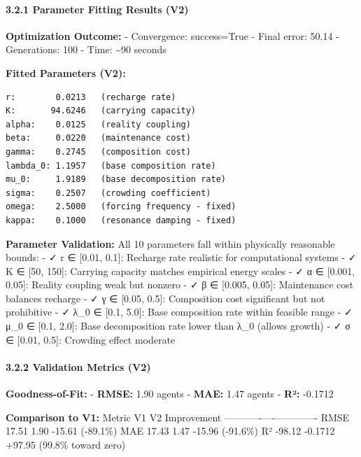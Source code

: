 \documentclass[
]{article}
\begin{document}
\paragraph{3.2.1 Parameter Fitting Results
(V2)}\label{parameter-fitting-results-v2}

\textbf{Optimization Outcome:} - Convergence: success=True - Final
error: 50.14 - Generations: 100 - Time: \textasciitilde90 seconds

\textbf{Fitted Parameters (V2):}

\begin{verbatim}
r:        0.0213   (recharge rate)
K:       94.6246   (carrying capacity)
alpha:    0.0125   (reality coupling)
beta:     0.0220   (maintenance cost)
gamma:    0.2745   (composition cost)
lambda_0: 1.1957   (base composition rate)
mu_0:     1.9189   (base decomposition rate)
sigma:    0.2507   (crowding coefficient)
omega:    2.5000   (forcing frequency - fixed)
kappa:    0.1000   (resonance damping - fixed)
\end{verbatim}

\textbf{Parameter Validation:} All 10 parameters fall within physically
reasonable bounds: - ✓ r ∈ {[}0.01, 0.1{]}: Recharge rate realistic for
computational systems - ✓ K ∈ {[}50, 150{]}: Carrying capacity matches
empirical energy scales - ✓ α ∈ {[}0.001, 0.05{]}: Reality coupling weak
but nonzero - ✓ β ∈ {[}0.005, 0.05{]}: Maintenance cost balances
recharge - ✓ γ ∈ {[}0.05, 0.5{]}: Composition cost significant but not
prohibitive - ✓ λ\_0 ∈ {[}0.1, 5.0{]}: Base composition rate within
feasible range - ✓ μ\_0 ∈ {[}0.1, 2.0{]}: Base decomposition rate lower
than λ\_0 (allows growth) - ✓ σ ∈ {[}0.01, 0.5{]}: Crowding effect
moderate

\paragraph{3.2.2 Validation Metrics (V2)}\label{validation-metrics-v2}

\textbf{Goodness-of-Fit:} - \textbf{RMSE:} 1.90 agents - \textbf{MAE:}
1.47 agents - \textbf{R²:} -0.1712

\textbf{Comparison to V1:} \textbar{} Metric \textbar{} V1 \textbar{} V2
\textbar{} Improvement \textbar{}
\textbar--------\textbar----\textbar----\textbar-------------\textbar{}
\textbar{} RMSE \textbar{} 17.51 \textbar{} 1.90 \textbar{} -15.61
(-89.1\%) \textbar{} \textbar{} MAE \textbar{} 17.43 \textbar{} 1.47
\textbar{} -15.96 (-91.6\%) \textbar{} \textbar{} R² \textbar{} -98.12
\textbar{} -0.1712 \textbar{} +97.95 (99.8\% toward zero) \textbar{}
\end{document}
